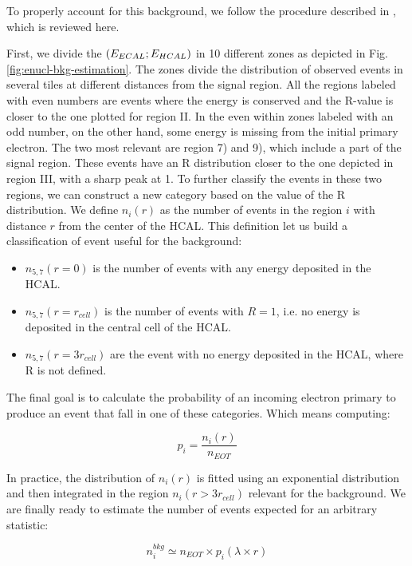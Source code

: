 To properly account for this background, we follow the procedure described in \cite{na64-neutrals-study,pdegen-thesis}, which is reviewed here.

First, we divide the $(E_{ECAL};E_{HCAL})$ in 10 different zones as depicted in Fig.\ref{fig:enucl-bkg-estimation}. The zones divide the distribution of observed events in several tiles at different distances from the signal region. All the regions labeled with even numbers are events where the energy is conserved and the R-value is closer to the one plotted for region II. In the even within zones labeled with an odd number, on the other hand, some energy is missing from the initial primary electron. The two most relevant are region 7) and 9), which include a part of the signal region. These events have an R distribution closer to the one depicted in region III, with a sharp peak at 1. To further classify the events in these two regions, we can construct a new category based on the value of the R distribution. We define $n_i(r)$ as the number of events in the region $i$ with distance $r$ from the center of the HCAL. This definition let us build a classification of event useful for the background:

\begin{itemize}
\item $n_{5,7}(r=0)$ is the number of events with any energy deposited in the HCAL.
\item $n_{5,7}(r=r_{cell})$ is the number of events with $R=1$, i.e. no energy is deposited in the central cell of the HCAL.
\item $n_{5,7}(r=3r_{cell})$ are the event with no energy deposited in the HCAL, where R is not defined.
\end{itemize}

The final goal is to calculate the probability of an incoming electron primary to produce an event that fall in one of these categories. Which means computing:

\begin{equation}
  \label{eq:enucl-prob}
  p_i = \frac{n_i(r)}{n_{EOT}}
\end{equation}

In practice, the distribution of $n_{i}(r)$ is fitted using an exponential distribution and then integrated in the region $n_i(r>3r_{cell})$ relevant for the background. We are finally ready to estimate the number of events expected for an arbitrary statistic:

\begin{equation}
  \label{eq:exp-bkg-inv-2021}
  n^{bkg}_i \simeq n_{EOT} \times p_i(\lambda \times r)
\end{equation}

